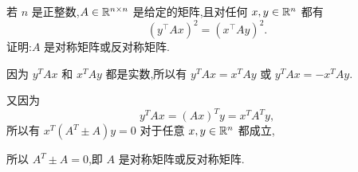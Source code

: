 \begin{problem}[选做]
    若 $n$ 是正整数,$A\in\mathbb{R}^{n\times n}$ 是给定的矩阵,且对任何 $x,y\in\mathbb{R}^n$ 都有
    \[
        (y^\top Ax)^2=(x^\top Ay)^2.
    \]
    证明:$A$ 是对称矩阵或反对称矩阵.
    \begin{solution}
        因为 $y^TAx$ 和 $x^TA y$ 都是实数,所以有 $y^TAx = x^TAy$ 或 $y^TAx = -x^TAy$.
        
        又因为
        \[
            y^T Ax = (Ax)^Ty = x^T A^T y,
        \]
        所以有 $x^T(A^T \pm A)y = 0$ 对于任意 $x,y\in\mathbb{R}^n$ 都成立,

        所以 $A^T \pm A = 0$,即 $A$ 是对称矩阵或反对称矩阵.
    \end{solution}
\end{problem}
